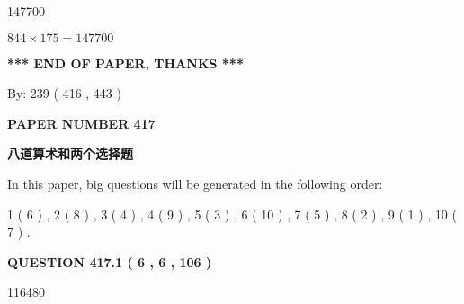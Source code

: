 \documentclass{ctexart}
\begin{document}
147700
 
 
 
 
\noindent{}

$ %
844 \times  %
175=   %
147700$
 
 
   
   
 \vspace{0.2in}
 
   
   
   
   
\vspace{1.0in} 
{\textbf{\large{ *** END OF PAPER, THANKS *** }}} 
   
   
\hspace{1.0in} By: 
 239 ( 416 ,  443 )
   
   
   
   
\newpage 
\setcounter{page}{ 
   417001 } 
   
   
   
   
 {\textbf{ \Large{ PAPER NUMBER  417  }}}
   
   
\vspace{0.2in}
   
   
   
   
   
   
 \vspace{0.2in}
{\LARGE {\textbf{ 八道算术和两个选择题}}}
   
   
   
\vspace{0.2in}
   
In this paper, big questions will be generated in the following order: 
   
   
   1 ( 6 )
 ,
   2 ( 8 )
 ,
   3 ( 4 )
 ,
   4 ( 9 )
 ,
   5 ( 3 )
 ,
   6 ( 10 )
 ,
   7 ( 5 )
 ,
   8 ( 2 )
 ,
   9 ( 1 )
 ,
   10 ( 7 )
 .
  
\vspace{0.2in}
  
{\textbf{\Large{QUESTION
417.1 
 ( 6 , 6 , 106 )
}}}
  
  
 
 
\noindent{}

116480
 
 
 
 
\noindent{}
\end{document}
